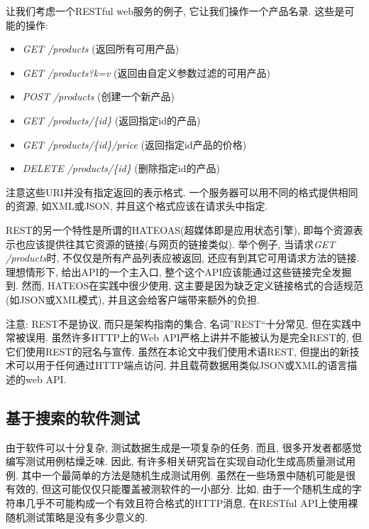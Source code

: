         让我们考虑一个RESTful web服务的例子, 它让我们操作一个产品名录. 这些是可能的操作: 
        \begin{itemize}
          \item \textit{GET /products} (返回所有可用产品)
            \item \textit{GET /products?k=v} (返回由自定义参数过滤的可用产品)
            \item \textit{POST /products} (创建一个新产品)
            \item \textit{GET /products/\{id\}} (返回指定id的产品)
            \item \textit{GET /products/\{id\}/price} (返回指定id产品的价格)
            \item \textit{DELETE /products/\{id\}} (删除指定id的产品)
        \end{itemize}
      注意这些URI并没有指定返回的表示格式. 一个服务器可以用不同的格式提供相同的资源, 如XML或JSON, 并且这个格式应该在请求头中指定. 
        
        REST的另一个特性是所谓的HATEOAS(超媒体即是应用状态引擎), 即每个资源表示也应该提供往其它资源的链接(与网页的链接类似). 举个例子, 当请求\textit{GET /products}时, 不仅仅是所有产品列表应被返回, 还应有到其它可用请求方法的链接. 理想情形下, 给出API的一个主入口, 整个这个API应该能通过这些链接完全发掘到. 然而, HATEOS在实践中很少使用\cite{rodriguez2016rest}, 这主要是因为缺乏定义链接格式的合适规范(如JSON或XML模式), 并且这会给客户端带来额外的负担. 
        
        注意: REST不是协议, 而只是架构指南的集合\cite{fielding2000architectural}, 名词”REST“十分常见, 但在实践中常被误用. 虽然许多HTTP上的Web API严格上讲并不能被认为是完全REST的\cite{rodriguez2016rest}\cite{fielding2000architectural}, 但它们使用REST的冠名与宣传. 虽然在本论文中我们使用术语REST, 但提出的新技术可以用于任何通过HTTP端点访问, 并且载荷数据用类似JSON或XML的语言描述的web API. 
    
    \subsection{基于搜索的软件测试}
    由于软件可以十分复杂, 测试数据生成是一项复杂的任务. 而且, 很多开发者都感觉编写测试用例枯燥乏味. 因此, 有许多相关研究旨在实现自动化生成高质量测试用例. 其中一个最简单的方法是随机生成测试用例\cite{arcuri2012random}. 虽然在一些场景中随机可能是很有效的, 但这可能仅仅只能覆盖被测软件的一小部分. 比如, 由于一个随机生成的字符串几乎不可能构成一个有效且符合格式的HTTP消息, 在RESTful API上使用裸随机测试策略是没有多少意义的. 
        
